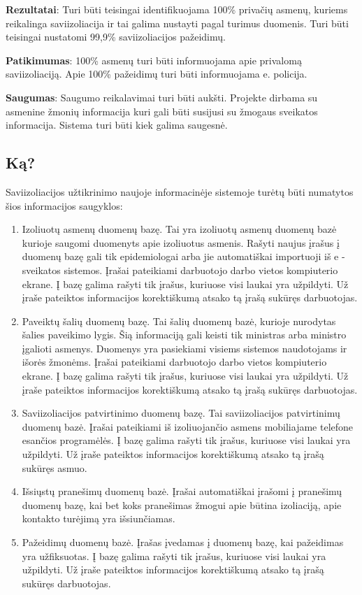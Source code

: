 \documentclass{VUMIFPSkursinis}
\begin{document}
\textbf{Rezultatai}:
Turi būti teisingai identifikuojama 100\% privačių asmenų, kuriems reikalinga saviizoliacija ir tai galima nustayti pagal turimus duomenis. 
Turi būti teisingai nustatomi 99,9\% saviizoliacijos pažeidimų.

\textbf{Patikimumas}:
100\% asmenų turi būti informuojama apie privalomą saviizoliaciją. Apie 100\% pažeidimų turi būti informuojama e. policija.

\textbf{Saugumas}:
Saugumo reikalavimai turi būti aukšti. Projekte dirbama su asmenine žmonių informacija kuri gali būti susijusi su žmogaus sveikatos informacija. Sistema turi būti kiek galima saugesnė.

\subsection{Ką?}\label{sec:ISReqWhat}
Saviizoliacijos užtikrinimo naujoje informacinėje sistemoje turėtų būti numatytos šios informacijos saugyklos:
\begin{enumerate}
	\item Izoliuotų asmenų duomenų bazę. 
	Tai yra izoliuotų asmenų duomenų bazė kurioje saugomi duomenyts apie izoliuotus asmenis. Rašyti naujus įrašus į duomenų bazę gali 
	tik epidemiologai arba jie automatiškai importuoji iš e - sveikatos sistemos. Įrašai pateikiami darbuotojo darbo vietos kompiuterio ekrane. 
	Į bazę galima rašyti tik įrašus, kuriuose visi laukai yra užpildyti. Už įraše pateiktos informacijos korektiškumą atsako tą įrašą sukūręs darbuotojas.

	\item Paveiktų šalių duomenų bazę.
	Tai šalių duomenų bazė, kurioje nurodytas šalies paveikimo lygis. Šią informaciją gali keisti tik ministras arba ministro įgalioti 
	asmenys. Duomenys yra pasiekiami visiems sistemos naudotojams ir išorės žmonėms. 
	Įrašai pateikiami darbuotojo darbo vietos kompiuterio ekrane.
	Į bazę galima rašyti tik įrašus, kuriuose visi laukai yra užpildyti.
	Už įraše pateiktos informacijos korektiškumą atsako tą įrašą sukūręs darbuotojas.

	\item Saviizoliacijos patvirtinimo duomenų bazę.
	Tai saviizoliacijos patvirtinimų duomenų bazė. Įrašai pateikiami iš izoliuojančio asmens mobiliajame telefone esančios programėlės.
	Į bazę galima rašyti tik įrašus, kuriuose visi laukai yra užpildyti.
	Už įraše pateiktos informacijos korektiškumą atsako tą įrašą sukūręs asmuo.

	\item Išsiųstų pranešimų duomenų bazė.
	Įrašai automatiškai įrašomi į pranešimų duomenų bazę, kai bet koks pranešimas žmogui apie būtina izoliaciją, apie kontakto turėjimą yra išsiunčiamas. 

	\item Pažeidimų duomenų bazė. 
	Įrašas įvedamas į duomenų bazę, kai pažeidimas yra užfiksuotas. 
	Į bazę galima rašyti tik įrašus, kuriuose visi laukai yra užpildyti.
	Už įraše pateiktos informacijos korektiškumą atsako tą įrašą sukūręs darbuotojas.

\end{enumerate} 
\end{document}
